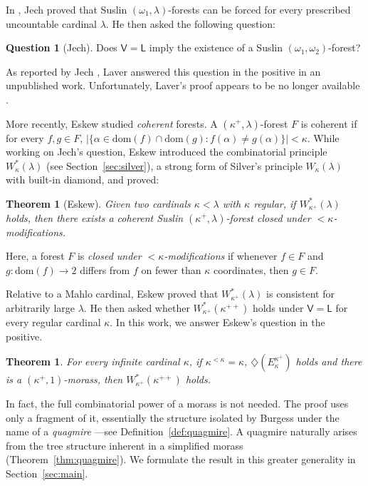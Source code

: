\documentclass[]{amsart}
\newtheorem{theorem}{Theorem}
\newtheorem{maintheorem}{Theorem}
\theoremstyle{definition}
\newtheorem*{question*}{Question}
\theoremstyle{remark}
\begin{document}
In \cite{MR325397}, Jech proved that Suslin $(\omega_1, \lambda)$-forests can be forced for every prescribed uncountable cardinal $\lambda$. He then asked the following question:

\begin{question*}[Jech]
Does $\mathsf{V = L}$ imply the existence of a Suslin $(\omega_1, \omega_2)$-forest?
\end{question*}

As reported by Jech  \cite{MR325397, MR506523, MR1940513}, Laver answered this question in the positive in an unpublished work. Unfortunately, Laver's proof appears to be no longer available \cite{MR3326048}. 

More recently, Eskew \cite{MR3326048} studied \emph{coherent} forests. A $(\kappa^+, \lambda)$-forest $F$ is coherent if for every $f,g \in F$, $|\{\alpha \in \mathrm{dom}(f) \cap \mathrm{dom}(g) : f(\alpha) \neq g(\alpha)\}| < \kappa$. While working on Jech's question, Eskew introduced the combinatorial principle $W^*_\kappa(\lambda)$ (see Section~\ref{sec:silver}), a strong form of Silver's principle $W_\kappa(\lambda)$ with built-in diamond, and proved:
\begin{theorem}[Eskew]
Given two cardinals $\kappa < \lambda$ with $\kappa$ regular, if $W^*_{\kappa^+}(\lambda)$ holds, then there exists a coherent Suslin $(\kappa^+, \lambda)$-forest closed under ${<}\kappa$-modifications.
\end{theorem}
Here, a forest $F$ is \emph{closed under ${<}\kappa$-modifications} if whenever $f \in F$ and $g: \mathrm{dom}(f) \rightarrow 2$ differs from $f$ on fewer than $\kappa$ coordinates, then $g \in F$. 

Relative to a Mahlo cardinal, Eskew proved that $W^*_{\kappa^+}(\lambda)$ is consistent for arbitrarily large $\lambda$. He then asked whether $W^*_{\kappa^+}(\kappa^{++})$ holds under $\mathsf{V= L}$ for every regular cardinal $\kappa$. In this work, we answer Eskew's question in the positive.

\begin{maintheorem}\label{thm:main}
For every infinite cardinal $\kappa$, if $\kappa^{< \kappa} = \kappa$, $\diamondsuit(E^{\kappa^+}_\kappa)$ holds and there is a $(\kappa^+, 1)$-morass, then  $W^*_{\kappa^+}(\kappa^{++})$ holds.
\end{maintheorem}

In fact, the full combinatorial power of a morass is not needed. The proof uses only a fragment of it, essentially the structure isolated by Burgess under the name of a \emph{quagmire} \cite{MR555420}---see Definition~\ref{def:quagmire}. A quagmire naturally arises from the tree structure inherent in a simplified morass (Theorem~\ref{thm:quagmire}). We formulate the result in this greater generality in Section~\ref{sec:main}. 
\end{document}
